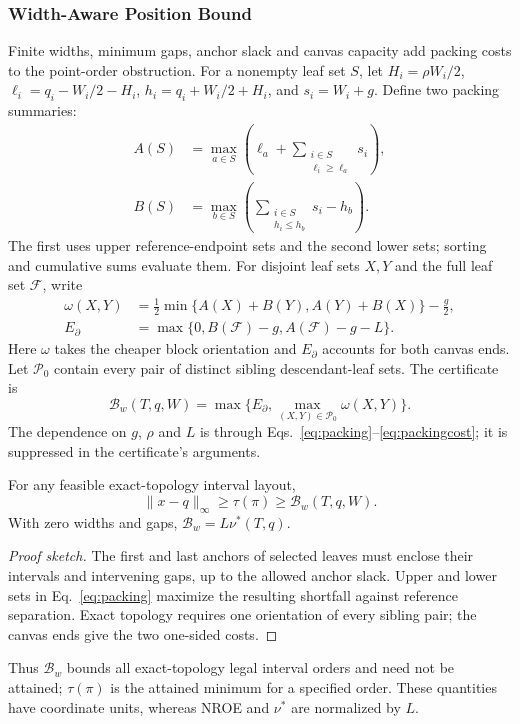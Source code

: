\subsubsection{Width-Aware Position Bound}
Finite widths, minimum gaps, anchor slack and canvas capacity add packing costs to the point-order obstruction. For a nonempty leaf set $S$, let $H_i=\rho W_i/2$, $\ell_i=q_i-W_i/2-H_i$, $h_i=q_i+W_i/2+H_i$, and $s_i=W_i+g$. Define two packing summaries:
\begin{equation}\label{eq:packing}
\begin{aligned}
 A(S)&=\max_{a\in S}\left(\ell_a+\sum_{\substack{i\in S\\\ell_i\ge\ell_a}}s_i\right),\\
 B(S)&=\max_{b\in S}\left(\sum_{\substack{i\in S\\h_i\le h_b}}s_i-h_b\right).
\end{aligned}
\end{equation}
The first uses upper reference-endpoint sets and the second lower sets; sorting and cumulative sums evaluate them. For disjoint leaf sets $X,Y$ and the full leaf set $\mathcal{F}$, write
\begin{equation}\label{eq:packingcost}
\begin{aligned}
 \omega(X,Y)&=\tfrac12\min\{A(X)+B(Y),A(Y)+B(X)\}-\tfrac g2,\\
 E_\partial&=\max\{0,B(\mathcal{F})-g,A(\mathcal{F})-g-L\}.
\end{aligned}
\end{equation}
Here $\omega$ takes the cheaper block orientation and $E_\partial$ accounts for both canvas ends. Let $\mathcal{P}_0$ contain every pair of distinct sibling descendant-leaf sets. The certificate is
\begin{equation}\label{eq:bwdef}
 \mathcal{B}_w(T,q,W)=\max\{E_\partial,\max_{(X,Y)\in\mathcal{P}_0}\omega(X,Y)\}.
\end{equation}
The dependence on $g$, $\rho$ and $L$ is through Eqs.~\ref{eq:packing}--\ref{eq:packingcost}; it is suppressed in the certificate's arguments.
\begin{theorem}\label{thm:width}
For any feasible exact-topology interval layout,
\begin{equation}\label{eq:widthbound}
 \|x-q\|_\infty\ge\tau(\pi)\ge\mathcal{B}_w(T,q,W).
\end{equation}
With zero widths and gaps, $\mathcal{B}_w=L\nu^*(T,q)$.
\end{theorem}
\begin{proof}[Proof sketch]
The first and last anchors of selected leaves must enclose their intervals and intervening gaps, up to the allowed anchor slack. Upper and lower sets in Eq.~\ref{eq:packing} maximize the resulting shortfall against reference separation. Exact topology requires one orientation of every sibling pair; the canvas ends give the two one-sided costs.
\end{proof}
Thus $\mathcal{B}_w$ bounds all exact-topology legal interval orders and need not be attained; $\tau(\pi)$ is the attained minimum for a specified order. These quantities have coordinate units, whereas NROE and $\nu^*$ are normalized by $L$.

